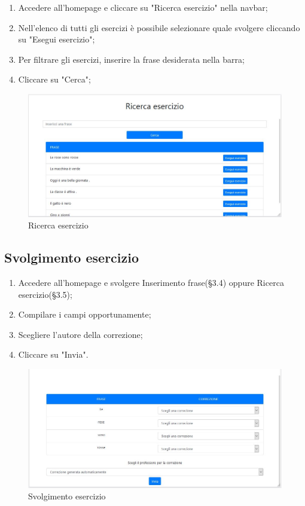 \documentclass[11pt,a4paper]{article}
\begin{document}
{	\begin{enumerate}
		\item Accedere all'homepage e cliccare su "Ricerca esercizio" nella navbar;
		\item Nell'elenco di tutti gli esercizi è possibile selezionare quale svolgere cliccando su "Esegui esercizio";
		\item Per filtrare gli esercizi, inserire la frase desiderata nella barra;
		\item Cliccare su "Cerca";
	\end{enumerate}
	
	\begin{figure}[h]
		\centering
		\includegraphics[scale=0.65]{images/ricerca.jpg}
		\caption{Ricerca esercizio}
	\end{figure}
	
	\subsection{Svolgimento esercizio}
	\begin{enumerate}
		\item Accedere all'homepage e svolgere Inserimento frase(\S3.4) oppure Ricerca esercizio(\S3.5);
		\item Compilare i campi opportunamente;
		\item Scegliere l'autore della correzione;
		\item Cliccare su "Invia".
	\end{enumerate}

	\begin{figure}[h!]
		\centering
		\includegraphics[scale=0.65]{images/svolgimento.jpg}
		\caption{Svolgimento esercizio}
	\end{figure}
	
}
\end{document}
